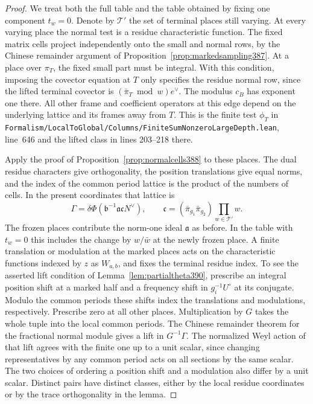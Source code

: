 \documentclass[a4paper,11pt]{article}
\theoremstyle{definition}
\theoremstyle{remark}
\newcommand{\srcloc}[2]{{\small\nolinkurl{#1.lean}}, line~#2}
\numberwithin{equation}{section}
\begin{document}
\begin{proof}
We treat both the full table and the table obtained by fixing
one component \(t_w=0\). Denote by \(\mathcal T'\) the set of
terminal places still varying. At every varying place the
normal test is a residue characteristic function. The fixed
matrix cells project independently onto the small and normal
rows, by the Chinese remainder argument of
Proposition~\ref{prop:markedsampling387}. At a place over
\(\pi_T\), the fixed small part must be integral. With this
condition, imposing the covector equation at \(T\) only
specifies the residue normal row, since the lifted terminal
covector is \((\bar\pi_T\bmod w)e^\vee\). The modulus \(c_B\)
has exponent one there. All other frame and coefficient
operators at this edge depend on the underlying lattice and
its frames away from \(T\). This is the finite test
\(\phi_T\) in
\srcloc{Formalism/LocalToGlobal/Columns/FiniteSumNonzeroLargeDepth}{646}
and the lifted class in lines 203--218 there.

Apply the proof of Proposition~\ref{prop:normalcells388} to
these places. The dual residue characters give orthogonality,
the position translations give equal norms, and the index of
the common period lattice is the product of the numbers of
cells. In the present coordinates that lattice is
\[
    \Gamma=\delta\Phi(\mathfrak b^{-1}\mathfrak a
                                \mathfrak c N^\vee),\qquad
    \mathfrak c=(\bar\pi_{g_1}\bar\pi_{g_2})
                                \prod_{w\in\mathcal T'} w .
\]
The frozen places contribute the norm-one ideal \(\mathfrak a\)
as before. In the table with \(t_w=0\) this includes the
change by \(w/\bar w\) at the newly frozen place. A finite
translation or modulation at the marked places acts on
the characteristic functions indexed by \(z\) as \(W_{a,b}\),
and fixes the terminal residue index. To see the asserted
lift condition of Lemma~\ref{lem:partialtheta390}, prescribe
an integral position shift at a marked half and a frequency
shift in \(g_i^{-1}U^\circ\) at its conjugate. Modulo the
common periods these shifts index the translations and
modulations, respectively. Prescribe zero at all other
places. Multiplication by \(G\) takes the whole tuple into
the local common periods. The Chinese remainder theorem for
the fractional normal module gives a lift in \(G^{-1}\Gamma\).
The normalized Weyl action of that lift agrees with the finite
one up to a unit scalar, since changing representatives by
any common period acts on all sections by the same scalar.
The two choices of ordering a position shift and a modulation
also differ by a unit scalar. Distinct pairs have distinct
classes, either by the local residue coordinates or by the
trace orthogonality in the lemma.


\end{proof}
\end{document}
